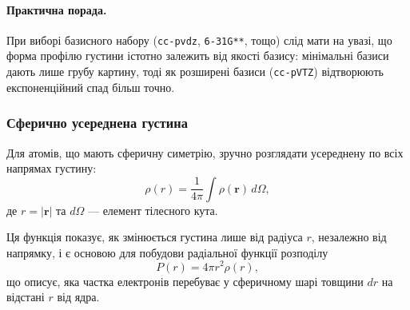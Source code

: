 \paragraph{Практична порада.}
При виборі базисного набору (\texttt{cc-pvdz}, \texttt{6-31G**}, тощо) слід мати на увазі, що форма профілю густини істотно залежить від якості базису:
мінімальні базиси дають лише грубу картину, тоді як розширені базиси (\texttt{cc-pVTZ}) відтворюють експоненційний спад більш точно.

\subsubsection{Сферично усереднена густина}

Для атомів, що мають сферичну симетрію, зручно розглядати усереднену по всіх напрямах густину:
\[
    \rho(r) = \frac{1}{4\pi} \int \rho(\mathbf{r}) \, d\Omega,
\]
де $r = |\mathbf{r}|$ та $d\Omega$ --- елемент тілесного кута.

Ця функція показує, як змінюється густина лише від радіуса $r$, незалежно від напрямку, і є основою для побудови радіальної функції розподілу
\[
    P(r) = 4\pi r^2 \rho(r),
\]
що описує, яка частка електронів перебуває у сферичному шарі товщини $dr$ на відстані $r$ від ядра.

